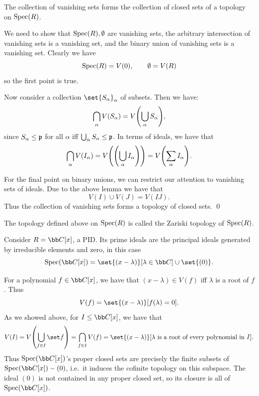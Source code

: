 \bprop

    The collection of vanishing sets forms the collection of closed sets of a topology on ${\rm Spec}(R)$.

\eprop

\bproof

    We need to show that ${\rm Spec}(R),\emptyset$ are vanishing sets, the arbitrary intersection of vanishing sets is a vanishing set, and the binary
    union of vanishing sets is a vanishing set.
    Clearly we have
    $$ {\rm Spec}(R) = V(0),\qquad \emptyset = V(R) $$
    so the first point is true.

    Now consider a collection $\set{S_\alpha}_\alpha$ of subsets.
    Then we have:
    $$ \bigcap_\alpha V(S_\alpha) = V\mathopen{}\mathclose{\left(\bigcup_\alpha S_\alpha\right)} , $$
    since $S_\alpha\leq{{\frak p}}$ for all $\alpha$ iff $\bigcup_\alpha S_\alpha\leq{{\frak p}}$.
    In terms of ideals, we have that
    $$ \bigcap_\alpha V(I_\alpha) = V\mathopen{}\mathclose{\left(\mathopen{}\mathclose{\left(\bigcup_\alpha I_\alpha\right)}\right)} = V\mathopen{}\mathclose{\left(\sum_\alpha I_\alpha\right)} . $$

    For the final point on binary unions, we can restrict our attention to vanishing sets of ideals.
    Due to the above lemma we have that
    $$ V(I) \cup V(J) = V(IJ) . $$
    Thus the collection of vanishing sets forms a topology of closed sets.
    \qed

\eproof

\bdefn

    The topology defined above on ${\rm Spec}(R)$ is called the {\emphcolor Zariski topology} of ${\rm Spec}(R)$.

\edefn

\bexam

    Consider $R=\bC[x]$, a PID.
    Its prime ideals are the principal ideals generated by irreducible elements and zero, in this case
    $$ \spec(\bC[x]) = \set{(x-\lambda)}[\lambda\in\bC]\cup\set{(0)} . $$

    For a polynomial $f\in\bC[x]$, we have that $(x-\lambda)\in V(f)$ iff $\lambda$ is a root of $f$.
    Thus
    $$ V(f) = \set{(x-\lambda)}[f(\lambda)=0] . $$
    As we showed above, for $I\leq\bC[x]$, we have that
    $$ V(I) = V\parens{\bigcup_{f\in I}\set f} = \bigcap_{f\in I}V(f) = \set{(x-\lambda)}[\hbox{$\lambda$ is a root of every polynomial in $I$}] . $$
    Thus $\spec(\bC[x])$'s proper closed sets are precisely the finite subsets of $\spec(\bC[x])-(0)$, i.e.\ it induces the cofinite topology on this subspace.
    The ideal $(0)$ is not contained in any proper closed set, so its closure is all of $\spec(\bC[x])$.


